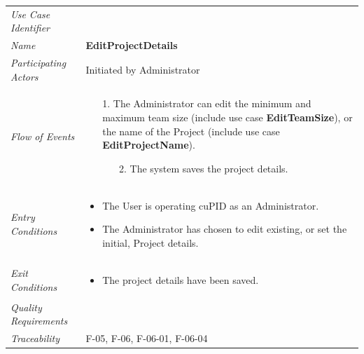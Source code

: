 \documentclass[12pt,letterpaper]{article}
\begin{document}
\begin{center}
	\begin{tabu} to 
		\toprule
		Use Case Identifier & \editprojectdetails{} \\
		Name & {\bf EditProjectDetails} \\
		Participating Actors & Initiated by Administrator \\
		Flow of Events & 
		\begin{minipage}[t]{\linewidth}
		    \begin{enumerate}
			    \item[1.] The Administrator can edit the minimum and maximum team size (include use case \textbf{EditTeamSize}), or the name of the Project (include use case \textbf{EditProjectName}).
			    \begin{enumerate}
			        \item[2.] The system saves the project details.
			    \end{enumerate}
			\end{enumerate}
		\end{minipage} \\

		Entry Conditions &
		\begin{minipage}[t]{\linewidth}
			\begin{itemize}
			    \item The User is operating cuPID as an Administrator.
			    \item The Administrator has chosen to edit existing, or set the initial, Project details.
	        \end{itemize}
		\end{minipage} \\

		Exit Conditions &
		\begin{minipage}[t]{\linewidth}
			\begin{itemize}
			    \item The project details have been saved.
	        \end{itemize}
		\end{minipage} \\


		Quality Requirements & \\

		Traceability & F-05, F-06, F-06-01, F-06-04 \\
		\toprule
	\end{tabu}
\end{center}
\end{document}
